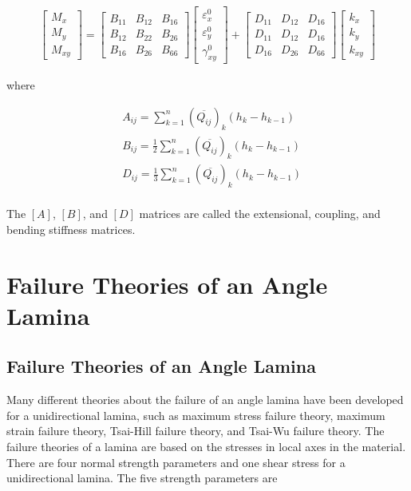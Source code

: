 \documentclass[smallextended]{svjour3}       %
\begin{document}
\begin{equation}
\begin{array}{l}
	\begin{bmatrix}
		M_x \\
		M_y \\
		M_{xy}
	\end{bmatrix}
	=
	\begin{bmatrix}
		B_{11} & B_{12} & B_{16} \\
		B_{12} & B_{22} & B_{26} \\
		B_{16} & B_{26} & B_{66} 
	\end{bmatrix}
    \begin{bmatrix}
		\varepsilon_x^0 \\
        \varepsilon_y^0 \\
		\gamma_{xy}^0
    \end{bmatrix} 
	+
	\begin{bmatrix}
		D_{11} & D_{12} & D_{16} \\
		D_{11} & D_{12} & D_{16} \\
		D_{16} & D_{26} & D_{66} 
	\end{bmatrix}
	\begin{bmatrix}
		k_x \\
		k_y \\
		k_{xy} 
	\end{bmatrix}
	\end{array}
\end{equation}



where

\begin{equation}
    \begin{split}
    &A_{ij}
	=
	\sum_{k=1}^n(\overline{Q_{ij}})_k(h_k-h_{k-1}) \\
    &B_{ij}
	=
	\frac{1}{2}\sum_{k=1}^n(\overline{Q_{ij}})_k(h_k-h_{k-1}) \\
    &D_{ij}
	=
	\frac{1}{3}\sum_{k=1}^n(\overline{Q_{ij}})_k(h_k-h_{k-1}) \\
    \end{split}
\end{equation}

The $[A]$, $[B]$, and $[D]$ matrices are called the extensional, coupling, and bending stiffness
matrices.



\section{Failure Theories of an Angle Lamina}
\subsection{Failure Theories of an Angle Lamina}
Many different theories about the failure of an angle lamina have been developed for a
unidirectional lamina, such as maximum stress failure theory, maximum strain failure theory,
Tsai-Hill failure theory, and Tsai-Wu failure theory. The failure theories of a lamina are based on
the stresses in local axes in the material. There are four normal strength parameters and one shear
stress for a unidirectional lamina. The five strength parameters are
\end{document}
